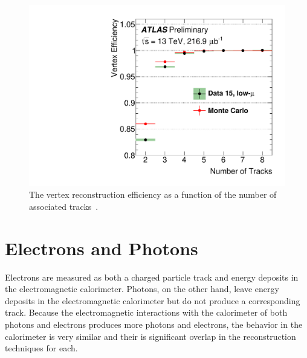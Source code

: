 \begin{figure}
\includegraphics[width=\halffig]{figures/vertex_reco_eff.pdf}
\caption{The vertex reconstruction efficiency as a function of the number of associated tracks~\cite{ATL-PHYS-PUB-2015-026}.}
\label{fig:vertex_reco_eff}
\end{figure}



\section{Electrons and Photons}
\label{sec:egamma}

Electrons are measured as both a charged particle track and energy deposits in the electromagnetic calorimeter.
Photons, on the other hand, leave energy deposits in the electromagnetic calorimeter but do not produce a corresponding track.
Because the electromagnetic interactions with the calorimeter of both photons and electrons produces more photons and electrons, the behavior in the calorimeter is very similar and their is significant overlap in the reconstruction techniques for each.

